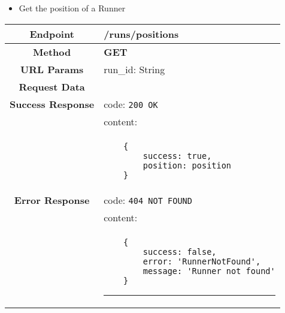     
    \begin{itemize}
            \item Get the position of a Runner
        \end{itemize}
        \begin{adjustwidth}{1cm}{}
            \begin{longtable}{|c|l|}
                \hline
                \textbf{Endpoint} & /runs/positions \\
                \hline
                \textbf{Method} & \textbf{GET} \\
                \hline
                \textbf{URL Params} &  run\_id: String \\
                \hline
                \textbf{Request Data} & \\
                \hline
                \textbf{Success Response} & code: \texttt{200 OK} \\
                &                           content: \\
                & \begin{minipage}[t]{0.5\textwidth}
                    \begin{adjustwidth}{1.5cm}{}
                    \begin{verbatim}
    {
        success: true, 
        position: position
    }
                    \end{verbatim}
                    \end{adjustwidth}
                  \end{minipage} \\
                  \hline
                \textbf{Error Response} & code: \texttt{404 NOT FOUND} \\
                &                         content: \\
                & \begin{minipage}[t]{0.7\textwidth}
                    \begin{adjustwidth}{1.5cm}{}
                    \begin{verbatim}
    {
        success: false, 
        error: 'RunnerNotFound',
        message: 'Runner not found'
    }
                    \end{verbatim}
                    \end{adjustwidth}
                     \par\noindent\rule{\textwidth}{1pt}
                 \vspace{4pt}
                  \end{minipage} \\

\end{longtable}
\end{adjustwidth}
